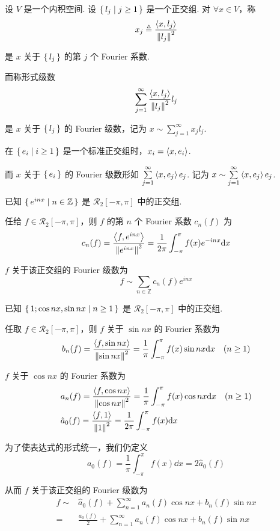 \begin{definition}
    设 $V$ 是一个内积空间. 设 $\set{l_j|j\ge 1}$ 是一个正交组. 对 $\forall x\in V$，称
$$
x_j\triangleq\frac{\left\langle{x,l_j}\right\rangle}{\left\lVert{l_j}\right\rVert^2}
$$

    是 $x$ 关于 $\set{l_j}$ 的第 $j$ 个 Fourier 系数.

    而称形式级数
$$
\sum_{j=1}^\infty\frac{\left\langle{x,l_j}\right\rangle}{\left\lVert{l_j}\right\rVert^2}l_j
$$

    是 $x$ 关于 $\set{l_j}$ 的 Fourier 级数，记为 $x\sim\sum\limits_{j=1}^\infty x_jl_j$.
\end{definition}

\begin{hint}
    在 $\set{e_i|i\ge 1}$ 是一个标准正交组时，$x_i=\left\langle{x,e_i}\right\rangle$.

    而 $x$ 关于 $\set{e_i}$ 的 Fourier 级数形如 $\sum\limits_{j=1}^\infty\left\langle{x,e_j}\right\rangle e_j$. 记为 $x\sim\sum\limits_{j=1}^\infty\left\langle{x,e_j}\right\rangle e_j$.
\end{hint}

\begin{example}
    已知 $\set{e^{inx}|n\in\mathbb{Z}}$ 是 $\mathcal{R}_2[-\pi,\pi]$ 中的正交组.

    任给 $f\in \mathcal{R}_2[-\pi,\pi]$，则 $f$ 的第 $n$ 个 Fourier 系数 $c_n(f)$ 为
$$
c_n(f)=\frac{\left\langle{f,e^{inx}}\right\rangle}{\left\lVert{e^{inx}}\right\rVert^2}=\frac{1}{2\pi}\int_{-\pi}^{\pi}f(x)e^{-inx}\mathrm{d} x
$$

    $f$ 关于该正交组的 Fourier 级数为
$$
f\sim\sum_{n\in\mathbb{Z}}c_n(f)e^{inx}
$$
\end{example}

\begin{example}
    已知 $\set{1;\cos nx,\sin nx|n\ge 1}$ 是 $\mathcal{R}_2[-\pi,\pi]$ 中的正交组.

    任取 $f\in \mathcal{R}_2[-\pi,\pi]$，则 $f$ 关于 $\sin nx$ 的 Fourier 系数为
$$
b_n(f)=\frac{\left\langle{f,\sin nx}\right\rangle}{\left\lVert{\sin nx}\right\rVert^2}=\frac{1}{\pi}\int_{-\pi}^\pi f(x)\sin nx\mathrm{d} x\quad(n\ge 1)
$$

    $f$ 关于 $\cos nx$ 的 Fourier 系数为
$$
\begin{aligned}
    &a_n(f)=\frac{\left\langle{f,\cos nx}\right\rangle}{\left\lVert{\cos nx}\right\rVert^2}=\frac{1}{\pi}\int_{-\pi}^\pi f(x)\cos nx\mathrm{d} x\quad(n\ge 1)\\
    &\hat{a}_0(f)=\frac{\left\langle{f,1}\right\rangle}{\left\lVert{1}\right\rVert^2}=\frac{1}{2\pi}\int_{-\pi}^{\pi}f(x)\mathrm{d} x
\end{aligned}
$$

    为了使表达式的形式统一，我们仍定义
$$
a_0(f)=\frac{1}{\pi}\int_{-\pi}^{\pi}f(x)\dd x=2\hat{a}_0(f)
$$

    从而 $f$ 关于该正交组的 Fourier 级数为
$$
\begin{aligned}
    f\sim&\hat{a}_0(f)+\sum_{n=1}^\infty a_n(f)\cos nx+b_n(f)\sin nx\\
    =&\frac{a_0(f)}{2}+\sum_{n=1}^\infty a_n(f)\cos nx+b_n(f)\sin nx
\end{aligned}
$$
\end{example}

